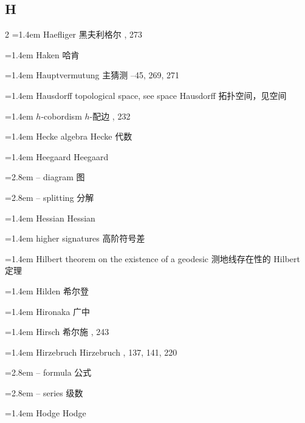 \subsection*{H}
\small
\begin{multicols}{2}
\noindent\hangindent=1.4em Haefliger \quad 黑夫利格尔 , 273\par
\noindent\hangindent=1.4em Haken \quad 哈肯 \par
\noindent\hangindent=1.4em Hauptvermutung \quad 主猜测 --45, 269, 271\par
\noindent\hangindent=1.4em Hausdorff topological space, see space \quad Hausdorff 拓扑空间，见空间 \quad\par
\noindent\hangindent=1.4em $h$-cobordism \quad $h$-配边 , 232\par
\noindent\hangindent=1.4em Hecke algebra \quad Hecke 代数 \par
\noindent\hangindent=1.4em Heegaard \quad Heegaard \quad\par
\noindent\hangindent=2.8em -- diagram \quad 图 \par
\noindent\hangindent=2.8em -- splitting \quad 分解 \par
\noindent\hangindent=1.4em Hessian \quad Hessian \par
\noindent\hangindent=1.4em higher signatures \quad 高阶符号差 \par
\noindent\hangindent=1.4em Hilbert theorem on the existence of a geodesic \quad 测地线存在性的 Hilbert 定理 \par
\noindent\hangindent=1.4em Hilden \quad 希尔登 \par
\noindent\hangindent=1.4em Hironaka \quad 广中 \par
\noindent\hangindent=1.4em Hirsch \quad 希尔施 , 243\par
\noindent\hangindent=1.4em Hirzebruch \quad Hirzebruch , 137, 141, 220\par
\noindent\hangindent=2.8em -- formula \quad 公式 \par
\noindent\hangindent=2.8em -- series \quad 级数 \par
\noindent\hangindent=1.4em Hodge \quad Hodge \quad\par

\end{multicols}
